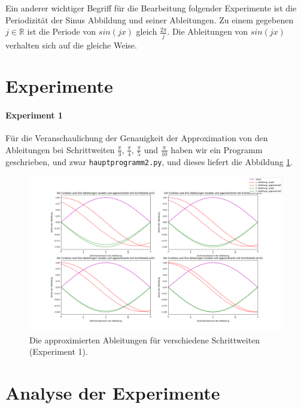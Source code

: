 \documentclass[smallheadings]{scrartcl}
\begin{document}
Ein anderer wichtiger Begriff für die Bearbeitung folgender Experimente ist die Periodizität der Sinus Abbildung und seiner Ableitungen. Zu einem gegebenen $j\in\mathbb{R}$ ist die Periode von $sin(jx)$ gleich $\frac{2\pi}{j}$. Die Ableitungen von $sin(jx)$ verhalten sich auf die gleiche Weise.

\section{Experimente}

\paragraph {Experiment 1}
Für die Veranschaulichung der Genauigkeit der Approximation von den Ableitungen bei Schrittweiten $\frac{\pi}{3}$, $\frac{\pi}{4}$, $\frac{\pi}{5}$ und $\frac{\pi}{10}$ haben wir ein Programm geschrieben, und zwar \texttt{hauptprogramm2.py}, und dieses liefert die Abbildung \ref{Abbildung 1}.

\begin{figure}
	\includegraphics[width=\linewidth]{4Bilder.png}
	\caption{Die approximierten Ableitungen für verschiedene Schrittweiten (Experiment 1).}
	\label{Abbildung 1}
\end{figure}

\section{Analyse der Experimente}
\end{document}
